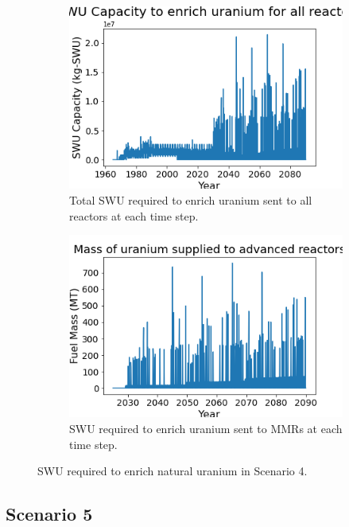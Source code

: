 \begin{figure}
    \centering
    \begin{subfigure}{0.4\textwidth}
        \centering
        \includegraphics[scale=0.3]{figures/totalswu_scenarios_4.png}
        \caption{Total \gls{SWU} required to enrich uranium sent to all reactors at each time step.}
        \label{fig:totalswu_4}
    \end{subfigure}
    \begin{subfigure}{0.4\textwidth}
        \centering
        \includegraphics[scale=0.3]{figures/advancedRX_fuelsupply_scenarios_4.png}
        \caption{\gls{SWU} required to enrich uranium sent to \glspl{MMR} at each time step.}
        \label{fig:haleuswu_4}
    \end{subfigure}
    \caption{\gls{SWU} required to enrich natural uranium in Scenario 4.}
    \label{fig:swu_4}
\end{figure}
\subsection{Scenario 5}

